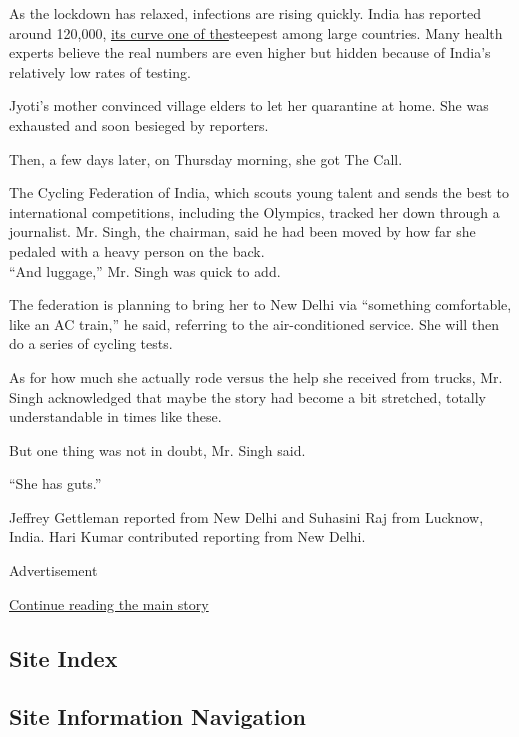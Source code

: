 As the lockdown has relaxed, infections are rising quickly. India has
reported around 120,000,
\href{https://timesofindia.indiatimes.com/india/indias-virus-cases-cross-100000-jump-at-fastest-pace-in-asia/articleshow/75829868.cms}{its
curve one of the}steepest among large countries. Many health experts
believe the real numbers are even higher but hidden because of India's
relatively low rates of testing.

Jyoti's mother convinced village elders to let her quarantine at home.
She was exhausted and soon besieged by reporters.

Then, a few days later, on Thursday morning, she got The Call.

The Cycling Federation of India, which scouts young talent and sends the
best to international competitions, including the Olympics, tracked her
down through a journalist. Mr. Singh, the chairman, said he had been
moved by how far she pedaled with a heavy person on the back.\\
``And luggage,'' Mr. Singh was quick to add.

The federation is planning to bring her to New Delhi via ``something
comfortable, like an AC train,'' he said, referring to the
air-conditioned service. She will then do a series of cycling tests.

As for how much she actually rode versus the help she received from
trucks, Mr. Singh acknowledged that maybe the story had become a bit
stretched, totally understandable in times like these.

But one thing was not in doubt, Mr. Singh said.

``She has guts.''

Jeffrey Gettleman reported from New Delhi and Suhasini Raj from Lucknow,
India. Hari Kumar contributed reporting from New Delhi.

Advertisement

\protect\hyperlink{after-bottom}{Continue reading the main story}

\hypertarget{site-index}{%
\subsection{Site Index}\label{site-index}}

\hypertarget{site-information-navigation}{%
\subsection{Site Information
Navigation}\label{site-information-navigation}}

